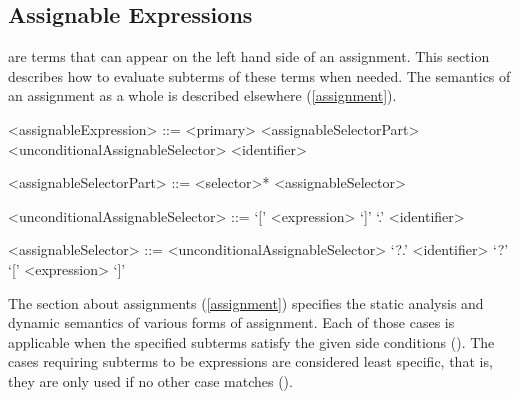 \documentclass[makeidx]{article}
\begin{document}
{\subsection{Assignable Expressions}

\LMHash{}%
 are terms
that can appear on the left hand side of an assignment.
This section describes how to evaluate subterms of these terms when needed.
The semantics of an assignment as a whole is described elsewhere
(\ref{assignment}).


\begin{grammar}
<assignableExpression> ::= <primary> <assignableSelectorPart>
  \alt \SUPER{} <unconditionalAssignableSelector>
  \alt <identifier>

<assignableSelectorPart> ::= <selector>* <assignableSelector>

<unconditionalAssignableSelector> ::= `[' <expression> `]'
  \alt `.' <identifier>

<assignableSelector> ::= <unconditionalAssignableSelector>
  \alt `?.' <identifier>
  \alt `?' `[' <expression> `]'

\end{grammar}

\LMHash{}%
The section about assignments
(\ref{assignment})
specifies the static analysis and dynamic semantics of
various forms of assignment.
Each of those cases is applicable when the specified subterms satisfy
the given side conditions
().
The cases requiring subterms to be expressions are considered least specific,
that is, they are only used if no other case matches
().

}
\end{document}
